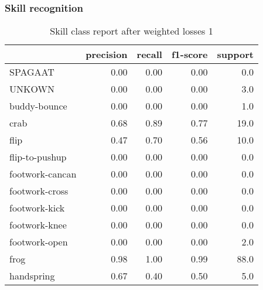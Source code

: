 \documentclass[aspectratio=169]{beamer}
\begin{document}
\begin{frame}
  \frametitle{Skill recognition}

  \begin{table}[h!]
    \begin{tabular}{|l|r|r|r|r|}
                \hline       & precision & recall  & f1-score &  support \\ \hline
                     SPAGAAT  &     0.00 &    0.00  &    0.00  &     0.0 \\
                      UNKOWN  &     0.00 &    0.00  &    0.00  &     3.0 \\
                buddy-bounce  &     0.00 &    0.00  &    0.00  &     1.0 \\
                        crab  &     0.68 &    0.89  &    0.77  &    19.0 \\
                        flip  &     0.47 &    0.70  &    0.56  &    10.0 \\
              flip-to-pushup  &     0.00 &    0.00  &    0.00  &     0.0 \\
             footwork-cancan  &     0.00 &    0.00  &    0.00  &     0.0 \\
              footwork-cross  &     0.00 &    0.00  &    0.00  &     0.0 \\
               footwork-kick  &     0.00 &    0.00  &    0.00  &     0.0 \\
               footwork-knee  &     0.00 &    0.00  &    0.00  &     0.0 \\
               footwork-open  &     0.00 &    0.00  &    0.00  &     2.0 \\
                        frog  &     0.98 &    1.00  &    0.99  &    88.0 \\
                  handspring  &     0.67 &    0.40  &    0.50  &     5.0 \\
            \hline
    \end{tabular}
    \caption[Skill class report after weighted losses 1]{Skill class report after weighted losses 1}
    \label{tbl:mvit-class-reports-skills-after-weighted-losses-1}
  \end{table}
\end{frame}
\end{document}
